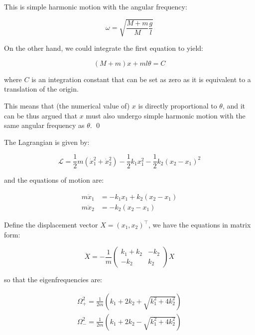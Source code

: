 \documentclass[12pt]{article}
\begin{document}
This is simple harmonic motion with the angular frequency:

\begin{equation}
    \omega = \sqrt{\frac{M + m}{M} \frac{g}{l}}
\end{equation}

On the other hand, we could integrate the first equation to yield:

\begin{equation}
    (M + m) x + ml \theta = C
\end{equation}

where $C$ is an integration constant that can be set as zero as it is equivalent to a translation of the origin.

This means that (the numerical value of) $x$ is directly proportional to $\theta$, and it can be thus argued that $x$ must also undergo simple harmonic motion with the same angular frequency as $\theta$.
\qed



The Lagrangian is given by:

\begin{equation}
    \mathcal{L} = \frac{1}{2} m (\dot{x}_{1}^{2} + \dot{x}_{2}^{2}) - \frac{1}{2} k_{1} x_{1}^{2} - \frac{1}{2} k_{2} (x_{2} - x_{1})^{2}
\end{equation}

and the equations of motion are:

\begin{equation}
\begin{split}
    m \ddot{x}_{1} &= -k_{1} x_{1} + k_{2}(x_{2} - x_{1}) \\
    m \ddot{x}_{2} &= -k_{2}(x_{2} - x_{1})
\end{split}
\end{equation}

Define the displacement vector $X = (x_{1}, x_{2})^{\intercal}$, we have the equations in matrix form:

\begin{equation}
    \ddot{X}
    =
    -\frac{1}{m}
    \begin{pmatrix}
        k_{1} + k_{2} & -k_{2} \\
        -k_{2} & k_{2}
    \end{pmatrix}
    X
\end{equation}

so that the eigenfrequencies are:

\begin{equation}
\begin{split}
    \Omega_{+}^{2} = \frac{1}{2m} \left( k_{1} + 2 k_{2} + \sqrt{k_{1}^2+4 k_{2}^2} \right) \\
    \Omega_{-}^{2} = \frac{1}{2m} \left( k_{1} + 2 k_{2} - \sqrt{k_{1}^2+4 k_{2}^2} \right)
\end{split}
\end{equation}
\end{document}
